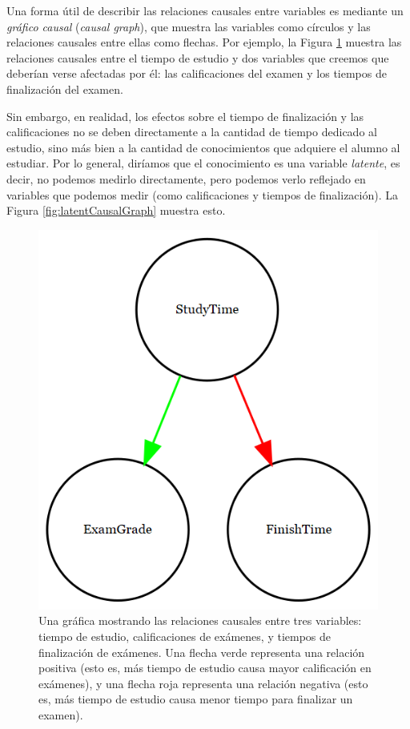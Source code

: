 \documentclass[
  12pt,
]{book}
\begin{document}
Una forma útil de describir las relaciones causales entre variables es mediante un \emph{gráfico causal} (\emph{causal graph}), que muestra las variables como círculos y las relaciones causales entre ellas como flechas. Por ejemplo, la Figura \ref{fig:simpleCausalGraph} muestra las relaciones causales entre el tiempo de estudio y dos variables que creemos que deberían verse afectadas por él: las calificaciones del examen y los tiempos de finalización del examen.

Sin embargo, en realidad, los efectos sobre el tiempo de finalización y las calificaciones no se deben directamente a la cantidad de tiempo dedicado al estudio, sino más bien a la cantidad de conocimientos que adquiere el alumno al estudiar. Por lo general, diríamos que el conocimiento es una variable \emph{latente}, es decir, no podemos medirlo directamente, pero podemos verlo reflejado en variables que podemos medir (como calificaciones y tiempos de finalización). La Figura \ref{fig:latentCausalGraph} muestra esto.

\begin{figure}
\includegraphics[width=6.94in,height=0.5\textheight]{images/dag_example} \caption{Una gráfica mostrando las relaciones causales entre tres variables: tiempo de estudio, calificaciones de exámenes, y tiempos de finalización de exámenes.  Una flecha verde representa una relación positiva (esto es, más tiempo de estudio causa mayor calificación en exámenes), y una flecha roja representa una relación negativa (esto es, más tiempo de estudio causa menor tiempo para finalizar un examen).}\label{fig:simpleCausalGraph}
\end{figure}
\end{document}
